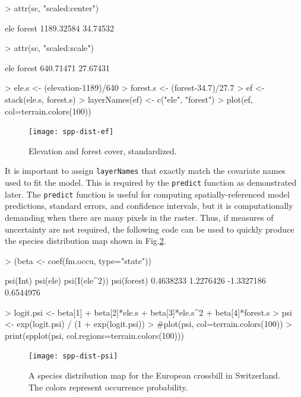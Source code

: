 \documentclass[a4paper]{article}
\renewenvironment{Schunk}{\vspace{\topsep}}{\vspace{\topsep}}
\begin{document}
\begin{Schunk}
\begin{Sinput}
> attr(sc, "scaled:center")
\end{Sinput}
\begin{Soutput}
       ele     forest 
1189.32584   34.74532 
\end{Soutput}
\begin{Sinput}
> attr(sc, "scaled:scale")
\end{Sinput}
\begin{Soutput}
      ele    forest 
640.71471  27.67431 
\end{Soutput}
\begin{Sinput}
> ele.s <- (elevation-1189)/640
> forest.s <- (forest-34.7)/27.7
> ef <- stack(ele.s, forest.s)
> layerNames(ef) <- c("ele", "forest")
> plot(ef, col=terrain.colors(100))
\end{Sinput}
\end{Schunk}
\begin{figure}
  \centering
  \texttt{[image: spp-dist-ef]}
  \caption{Elevation and forest cover, standardized.}
\label{fig:ef}
\end{figure}

It is important to assign \verb+layerNames+
that exactly match the covariate names used to fit the model. This
is required by the \verb+predict+ function as demonstrated later.
The \verb+predict+ function is useful for computing
spatially-referenced model predictions, standard errors, and
confidence intervals, but it is computationally demanding when
there are many pixels in the raster. Thus, if measures of uncertainty
are not required, the following code can be used to quickly produce
the species distribution map shown in Fig.\ref{fig:psi1}.

\begin{Schunk}
\begin{Sinput}
> (beta <- coef(fm.occu, type="state"))
\end{Sinput}
\begin{Soutput}
     psi(Int)      psi(ele) psi(I(ele^2))   psi(forest) 
    0.4638233     1.2276426    -1.3327186     0.6544976 
\end{Soutput}
\begin{Sinput}
> logit.psi <- beta[1] + beta[2]*ele.s + beta[3]*ele.s^2 + beta[4]*forest.s
> psi <- exp(logit.psi) / (1 + exp(logit.psi))
> #plot(psi, col=terrain.colors(100))
> print(spplot(psi, col.regions=terrain.colors(100)))
\end{Sinput}
\end{Schunk}
\begin{figure}
  \texttt{[image: spp-dist-psi]}
  \centering
  \caption{A species distribution map for the European crossbill in
    Switzerland. The colors represent occurrence probability.}
\label{fig:psi1}
\end{figure}
\end{document}
